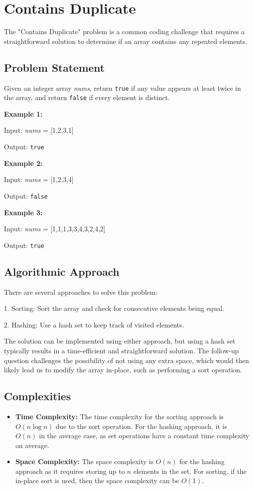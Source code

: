
\chapter{Contains Duplicate}
\label{chap:Contains_Duplicate}

The "Contains Duplicate" problem is a common coding challenge that requires a straightforward solution to determine if an array contains any repeated elements.

\section*{Problem Statement}
Given an integer array \textit{nums}, return \texttt{true} if any value appears at least twice in the array, and return \texttt{false} if every element is distinct.

\textbf{Example 1:}

Input: \textit{nums} = [1,2,3,1]

Output: \texttt{true}

\textbf{Example 2:}

Input: \textit{nums} = [1,2,3,4]

Output: \texttt{false}

\textbf{Example 3:}

Input: \textit{nums} = [1,1,1,3,3,4,3,2,4,2]

Output: \texttt{true}


\section*{Algorithmic Approach}
There are several approaches to solve this problem:

1. Sorting: Sort the array and check for consecutive elements being equal.

2. Hashing: Use a hash set to keep track of visited elements.

The solution can be implemented using either approach, but using a hash set typically results in a time-efficient and straightforward solution. The follow-up question challenges the possibility of not using any extra space, which would then likely lead us to modify the array in-place, such as performing a sort operation.

\section*{Complexities}
\begin{itemize}
	\item \textbf{Time Complexity:} The time complexity for the sorting approach is \(O(n \log n)\) due to the sort operation. For the hashing approach, it is \(O(n)\) in the average case, as set operations have a constant time complexity on average.
	\item \textbf{Space Complexity:} The space complexity is \(O(n)\) for the hashing approach as it requires storing up to \(n\) elements in the set. For sorting, if the in-place sort is used, then the space complexity can be \(O(1)\).
\end{itemize}

